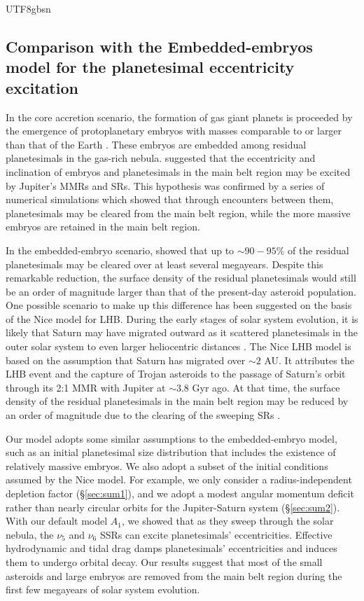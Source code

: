 \documentclass[tighten]{aastex6}
\begin{document}
\begin{CJK*}{UTF8}{gbsn}
\subsection{Comparison with the Embedded-embryos model for 
the planetesimal eccentricity excitation}

In the core accretion scenario, the formation of gas giant 
planets is proceeded by the emergence of protoplanetary 
embryos with masses comparable to or larger than that of the
Earth \citep{pollack1996,idalin2004}. These embryos are 
embedded among residual planetesimals in the gas-rich nebula.
\cite{wetherill1992} suggested that the eccentricity and 
inclination of embryos and planetesimals in the main belt 
region may be excited by Jupiter's MMRs and SRs.  This 
hypothesis was confirmed by a series of numerical simulations 
\citep{chambers2001, petit2001} which showed that through 
encounters between them, planetesimals may be cleared from 
the main belt region,
while the more massive embryos are retained in the main
belt region.  

In the embedded-embryo scenario, 
\cite{obrien2007} showed that up to $\sim 90-95\%$ of the 
residual planetesimals may be cleared over at least several megayears. 
Despite this remarkable reduction, the surface density of the 
residual planetesimals would still be an order of magnitude 
larger than that of the present-day asteroid population.  
One possible scenario to make up this difference has been 
suggested on the basis of the Nice model 
for LHB.  During the early stages 
of solar system evolution, it is likely that Saturn may 
have migrated outward as it scattered planetesimals in 
the outer solar system to even larger heliocentric 
distances \citep{fernandez1984, malhotra1993}. The Nice 
LHB model is based on the assumption that Saturn has migrated 
over $\sim 2$ AU. It attributes the LHB event and the 
capture of Trojan asteroids to the 
passage of Saturn's orbit through its 2:1 MMR with Jupiter 
at $\sim 3.8$ Gyr ago. At that time, the surface density
of the residual planetesimals in the main belt region may be 
reduced by an order of magnitude due to the clearing of the 
sweeping SRs \citep{gomes2005, morbidelli2005, tsiganis2005}.  


Our model adopts some similar assumptions to the embedded-embryo 
model, such as 
an initial planetesimal size distribution that includes the existence
of relatively massive embryos. We also adopt a subset of the initial
conditions assumed by the Nice model.  For example, we only consider 
a radius-independent depletion factor (\S\ref{sec:sum1}), and we adopt
a modest angular momentum deficit rather than nearly circular orbits
for the Jupiter-Saturn system (\S\ref{sec:sum2}). With our default model
$A_1$, we showed that as they sweep through the solar nebula, the $\nu_5$ 
and $\nu_6$ SSRs can excite planetesimals' eccentricities. Effective 
hydrodynamic and tidal drag damps planetesimals' eccentricities and induces
them to undergo orbital decay.  Our results suggest that most of the
small asteroids and large embryos are removed from the main belt region
during the first few megayears of solar system evolution.  


\end{CJK*}
\end{document}
